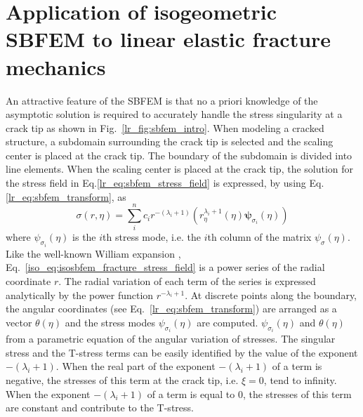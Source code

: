\section{Application of isogeometric SBFEM to linear elastic fracture mechanics}
\label{iso_section:fracture}
An attractive feature of the SBFEM is that no a priori knowledge of the asymptotic solution is required to accurately handle the stress singularity at a crack tip as shown in Fig.~\ref{lr_fig:sbfem_intro}.
When modeling a cracked structure, a subdomain surrounding the crack tip is selected and the scaling center is placed at the crack tip.
The boundary of the subdomain is divided into line elements.
When the scaling center is placed at the crack tip, the solution for the stress field in Eq.\ref{lr_eq:sbfem_stress_field} is expressed, by using Eq.\ref{lr_eq:sbfem_transform}, as
    \begin{equation}
        \sigma(r,\eta) = \sum_i^n
            c_i r^{-(\lambda_i+1)} \left(
                r_\eta^{\lambda_i+1} (\eta)
                \boldsymbol{\psi}_{\sigma_i}(\eta)
            \right)
        \label{iso_eq:isosbfem_fracture_stress_field}
    \end{equation}
where $\psi_{\sigma_i}(\eta)$ is the $i$th stress mode, i.e. the $i$th column of the matrix $\psi_\sigma(\eta)$.
Like the well-known William expansion \citep{Williams1957109}, Eq.~\ref{iso_eq:isosbfem_fracture_stress_field} is a power series of the radial coordinate $r$.
The radial variation of each term of the series is expressed analytically by the power function $r^{-\lambda_i + 1}$.
At discrete points along the boundary, the angular coordinates (see Eq.~\ref{lr_eq:sbfem_transform}) are arranged as a vector $\theta(\eta)$ and the stress modes $\psi_{\sigma_i}(\eta)$ are computed.
$\psi_{\sigma_i}(\eta)$ and $\theta(\eta)$ from a parametric equation of the angular variation of stresses.
The singular stress and the T-stress terms can be easily identified by the value of the exponent $-(\lambda_i+1)$.
When the real part of the exponent $-(\lambda_i+1)$ of a term is negative, the stresses of this term at the crack tip, i.e. $\xi=0$, tend to infinity.
When the exponent $-(\lambda_i+1)$ of a term is equal to 0, the stresses of this term are constant and contribute to the T-stress.
